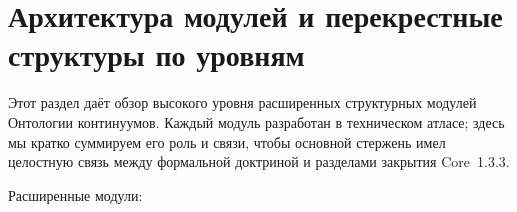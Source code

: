 
\section{Архитектура модулей и перекрестные структуры по уровням}
\label{sec:modules_master}

Этот раздел даёт обзор высокого уровня расширенных структурных модулей
Онтологии континуумов. Каждый модуль разработан в техническом атласе;
здесь мы кратко суммируем его роль и связи, чтобы основной стержень имел
целостную связь между формальной доктриной и разделами закрытия Core~1.3.3.

Расширенные модули:

